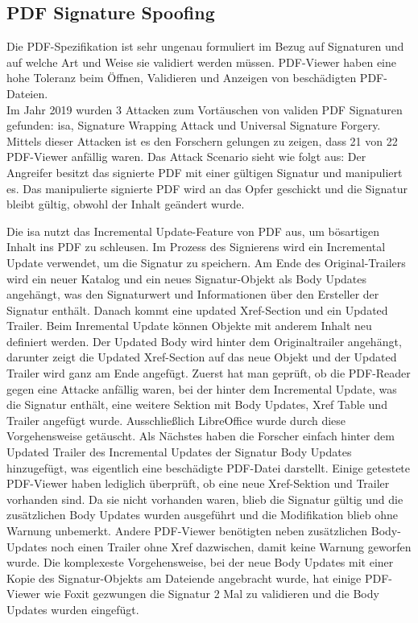 \subsection{PDF Signature Spoofing}
Die PDF-Spezifikation ist sehr ungenau formuliert im Bezug auf Signaturen und auf welche Art und Weise sie validiert werden müssen. PDF-Viewer haben eine hohe Toleranz beim Öffnen, Validieren und Anzeigen von beschädigten PDF-Dateien. \\
Im Jahr 2019 wurden 3 Attacken zum Vortäuschen von validen PDF Signaturen gefunden: \gls{isa}, Signature Wrapping Attack und Universal Signature Forgery. Mittels dieser Attacken ist es den Forschern gelungen zu zeigen, dass 21 von 22 PDF-Viewer anfällig waren. Das Attack Scenario sieht wie folgt aus: Der Angreifer besitzt das signierte PDF mit einer gültigen Signatur und manipuliert es. Das manipulierte  signierte PDF wird an das Opfer geschickt und die Signatur bleibt gültig, obwohl der Inhalt geändert wurde.
\par
Die \gls{isa} nutzt das Incremental Update-Feature von PDF aus, um bösartigen Inhalt ins PDF zu schleusen. Im Prozess des Signierens wird ein Incremental Update verwendet, um die Signatur zu speichern. Am Ende des Original-Trailers wird ein neuer Katalog und ein neues Signatur-Objekt als Body Updates angehängt, was den Signaturwert und Informationen über den Ersteller der Signatur enthält. Danach kommt eine updated Xref-Section und ein Updated Trailer. Beim Inremental Update können Objekte mit anderem Inhalt neu definiert werden. Der Updated Body wird hinter dem Originaltrailer angehängt, darunter zeigt die Updated Xref-Section auf das neue Objekt und der Updated Trailer wird ganz am Ende angefügt. Zuerst hat man geprüft, ob die PDF-Reader gegen eine Attacke anfällig waren, bei der hinter dem Incremental Update, was die Signatur enthält, eine weitere Sektion mit Body Updates, Xref Table und Trailer angefügt wurde. Ausschließlich LibreOffice wurde durch diese Vorgehensweise getäuscht. Als Nächstes haben die Forscher einfach hinter dem Updated Trailer des Incremental Updates der Signatur Body Updates hinzugefügt, was eigentlich eine beschädigte PDF-Datei darstellt. Einige getestete PDF-Viewer haben lediglich überprüft, ob eine neue Xref-Sektion und Trailer vorhanden sind. Da sie nicht vorhanden waren, blieb die Signatur gültig und die zusätzlichen Body Updates wurden ausgeführt und die Modifikation blieb ohne Warnung unbemerkt. Andere PDF-Viewer benötigten neben zusätzlichen Body-Updates noch einen Trailer ohne Xref dazwischen, damit keine Warnung geworfen wurde. Die komplexeste Vorgehensweise, bei der neue Body Updates mit einer Kopie des Signatur-Objekts am Dateiende angebracht wurde, hat einige PDF-Viewer wie Foxit gezwungen die Signatur 2 Mal zu validieren und die Body Updates wurden eingefügt.
